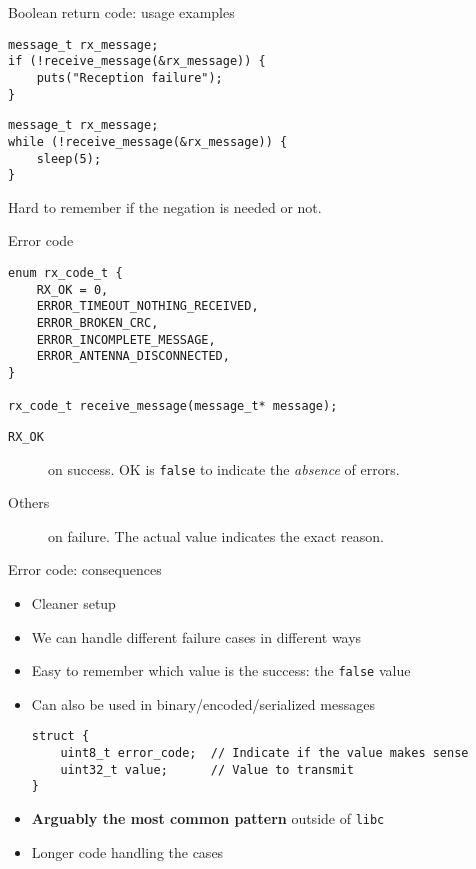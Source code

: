 \documentclass[aspectratio=169,14pt]{beamer}
\begin{document}
\begin{frame}[fragile]{Boolean return code: usage examples}
\begin{lstlisting}[style=cstyle]
message_t rx_message;
if (!receive_message(&rx_message)) {
    puts("Reception failure");
}
\end{lstlisting}

\begin{lstlisting}[style=cstyle]
message_t rx_message;
while (!receive_message(&rx_message)) {
    sleep(5);
}
\end{lstlisting}

Hard to remember if the negation is needed or not.
\end{frame}



\begin{frame}[fragile]{Error code}
\begin{lstlisting}[style=cstyle]
enum rx_code_t {
    RX_OK = 0,
    ERROR_TIMEOUT_NOTHING_RECEIVED,
    ERROR_BROKEN_CRC,
    ERROR_INCOMPLETE_MESSAGE,
    ERROR_ANTENNA_DISCONNECTED,
}

rx_code_t receive_message(message_t* message);
\end{lstlisting}

\begin{description}
    \item[\texttt{RX\_OK}] on success. OK is \texttt{false} to indicate the \textit{absence} of errors.
    \item[Others] on failure. The actual value indicates the exact reason.
\end{description}
\end{frame}



\begin{frame}[fragile]{Error code: consequences}
\begin{itemize}
    \item[\good] Cleaner setup
    \item[\good] We can handle different failure cases in different ways
    \item[\good] Easy to remember which value is the success: the \texttt{false} value
    \item[\good] Can also be used in binary/encoded/serialized messages
                 \begin{small}
\begin{lstlisting}[style=cstyle]
struct {
    uint8_t error_code;  // Indicate if the value makes sense
    uint32_t value;      // Value to transmit
}
\end{lstlisting}
                 \end{small}
    \item[\good] \textbf{Arguably the most common pattern} outside of \texttt{libc}
    \item[\bad] Longer code handling the cases
\end{itemize}
\end{frame}
\end{document}
